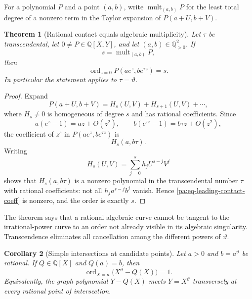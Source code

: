 \documentclass[11pt,oneside]{article}
\newtheorem{theorem}{Theorem}[section]
\newtheorem{corollary}[theorem]{Corollary}
\theoremstyle{definition}
\theoremstyle{remark}
\newcommand{\Q}{\mathbb Q}
\newcommand{\thetaq}{\vartheta}
\begin{document}
For a polynomial \(P\) and a point \((a,b)\), write
\(\operatorname{mult}_{(a,b)}P\) for the least total degree of a nonzero term in the Taylor
expansion of \(P(a+U,b+V)\).

\begin{theorem}[Rational contact equals algebraic multiplicity]
\label{pa:thm-contact-multiplicity}
Let \(\tau\) be transcendental, let \(0\ne P\in\Q[X,Y]\), and let
\((a,b)\in\Q_{>0}^2\).  If
\[
 s=\operatorname{mult}_{(a,b)}P,
\]
then
\begin{equation}
 \operatorname{ord}_{z=0}P(ae^z,be^{\tau z})=s.
 \label{pa:eq-contact-equals-mult}
\end{equation}
In particular the statement applies to \(\tau=\thetaq\).
\end{theorem}

\begin{proof}
Expand
\[
 P(a+U,b+V)=H_s(U,V)+H_{s+1}(U,V)+\cdots,
\]
where \(H_s\ne0\) is homogeneous of degree \(s\) and has rational coefficients.  Since
\[
 a(e^z-1)=az+O(z^2),
 \qquad
 b(e^{\tau z}-1)=b\tau z+O(z^2),
\]
the coefficient of \(z^s\) in \(P(ae^z,be^{\tau z})\) is
\begin{equation}
 H_s(a,b\tau).
 \label{pa:eq-leading-contact-coeff}
\end{equation}
Writing
\[
 H_s(U,V)=\sum_{j=0}^{s}h_jU^{s-j}V^j
\]
shows that \(H_s(a,b\tau)\) is a nonzero polynomial in the transcendental number \(\tau\)
with rational coefficients: not all \(h_j a^{s-j}b^j\) vanish.  Hence
\eqref{pa:eq-leading-contact-coeff} is nonzero, and the order is exactly \(s\).
\end{proof}

The theorem says that a rational algebraic curve cannot be tangent to the irrational-power
curve to an order not already visible in its algebraic singularity.  Transcendence eliminates
all cancellation among the different powers of \(\thetaq\).

\begin{corollary}[Simple intersections at candidate points]
\label{pa:cor-simple-candidate}
Let \(a>0\) and \(b=a^{\thetaq}\) be rational.  If \(Q\in\Q[X]\) and \(Q(a)=b\), then
\begin{equation}
 \operatorname{ord}_{X=a}\bigl(X^{\thetaq}-Q(X)\bigr)=1.
 \label{pa:eq-simple-graph-intersection}
\end{equation}
Equivalently, the graph polynomial \(Y-Q(X)\) meets \(Y=X^{\thetaq}\) transversely at every
rational point of intersection.
\end{corollary}
\end{document}
